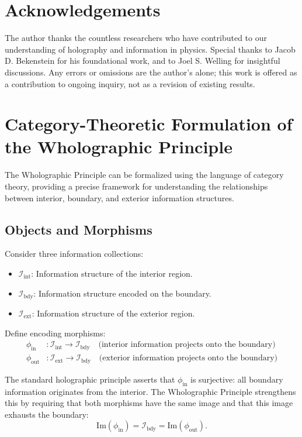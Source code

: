 ﻿\documentclass[12pt]{article}
\begin{document}
\section*{Acknowledgements}
The author thanks the countless researchers who have contributed to our understanding of holography and information in physics. Special thanks to Jacob D. Bekenstein for his foundational work, and to Joel S. Welling for insightful discussions. Any errors or omissions are the author’s alone; this work is offered as a contribution to ongoing inquiry, not as a revision of existing results.


\appendix


\section{Category-Theoretic Formulation of the Wholographic Principle}


The Wholographic Principle can be formalized using the language of category theory, providing a precise framework for understanding the relationships between interior, boundary, and exterior information structures.


\subsection{Objects and Morphisms}


Consider three information collections:


\begin{itemize}
    \item $\mathcal{I}_{\mathrm{int}}$: Information structure of the interior region.
    \item $\mathcal{I}_{\mathrm{bdy}}$: Information structure encoded on the boundary.
    \item $\mathcal{I}_{\mathrm{ext}}$: Information structure of the exterior region.
\end{itemize}


Define encoding morphisms:
\begin{align*}
    \phi_{\mathrm{in}} &: \mathcal{I}_{\mathrm{int}} \to \mathcal{I}_{\mathrm{bdy}} \quad \text{(interior information projects onto the boundary)} \\
    \phi_{\mathrm{out}} &: \mathcal{I}_{\mathrm{ext}} \to \mathcal{I}_{\mathrm{bdy}} \quad \text{(exterior information projects onto the boundary)}
\end{align*}


The standard holographic principle asserts that $\phi_{\mathrm{in}}$ is surjective: all boundary information originates from the interior. The Wholographic Principle strengthens this by requiring that both morphisms have the same image and that this image exhausts the boundary:
\[
\mathrm{Im}(\phi_{\mathrm{in}}) = \mathcal{I}_{\mathrm{bdy}} = \mathrm{Im}(\phi_{\mathrm{out}}).
\]
\end{document}
